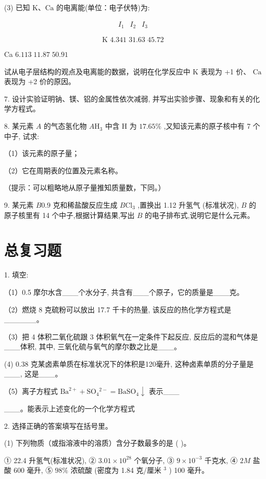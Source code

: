 \documentclass[10pt]{article}
\begin{document}
(3) 已知 \(\mathrm{K}\text{、}\mathrm{{Ca}}\) 的电离能(单位：电子伏特)为:

\[
\begin{array}{lll} {I}_{1} & {I}_{2} & {I}_{3} \end{array}
\]

\[
\text{K 4.341 31.63 45.72}
\]

Ca \({6.113}\;{11.87}\;{50.91}\)

试从电子层结构的观点及电离能的数据，说明在化学反应中 \(\mathrm{K}\) 表现为 +1 价、 \(\mathrm{{Ca}}\) 表现为 +2 价的原因。

7. 设计实验证明钠、镁、铝的金属性依次减弱, 并写出实验步骤、现象和有关的化学方程式。

8. 某元素 \(A\) 的气态氢化物 \(A{\mathrm{H}}_{3}\) 中含 \(\mathrm{H}\) 为 \({17.65}\%\) ,又知该元素的原子核中有 7 个中子, 试求:

（1）该元素的原子量；

（2）它在周期表的位置及元素名称。

（提示：可以粗略地从原子量推知质量数，下同。）

9. 某元素 \({B0.9}\) 克和稀盐酸反应生成 \(B{\mathrm{{Cl}}}_{3}\) ,置换出 1.12 升氢气 (标准状况), \(B\) 的原子核里有 14 个中子,根据计算结果,写出 \(B\) 的电子排布式,说明它是什么元素。

\section*{总复习题}

1. 填空:

（1）0.5 摩尔水含\_\_\_个水分子, 共含有\_\_\_个原子，它的质量是\_\_\_克。

（2）燃烧 8 克硫粉可以放出 17.7 千卡的热量, 该反应的热化学方程式是\_\_\_\_\_\_。

（3）把 4 体积二氧化硫跟 3 体积氧气在一定条件下起反应, 反应后的混和气体是\_\_\_体积, 其中, 三氧化硫与氧气的摩尔数之比是\_\_\_。

(4) 0.38 克某卤素单质在标准状况下的体积是120毫升, 这种卤素单质的分子量是\_\_\_, 这是\_\_\_。

（5）离子方程式 \({\mathrm{{Ba}}}^{2 + } + {\mathrm{{SO}}}_{4}{}^{2 - } = {\mathrm{{BaSO}}}_{4} \downarrow\) 表示\_\_\_

\_\_\_。能表示上述变化的一个化学方程式

2. 选择正确的答案填写在括号里。

(1) 下列物质（或指溶液中的溶质）含分子数最多的是 ( )。

① 22.4 升氢气(标准状况), ② \({3.01} \times {10}^{28}\) 个氧分子, ③ \(9 \times {10}^{-3}\) 千克水, ④ \({2M}\) 盐酸 600 毫升, ⑤ \({98}\%\) 浓硫酸 (密度为 1.84 克/厘米 \({}^{3}\) ) 100 毫升。
\end{document}
